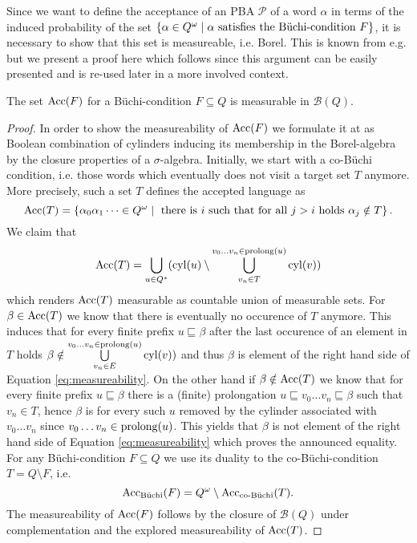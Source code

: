 Since we want to define the acceptance of an \ac{PBA} $\mathcal{P}$ of a word
$\alpha$ in terms of the induced probability of the set 
$\left\{\alpha\in Q^{\omega}\mid\alpha\text{ satisfies the Büchi-condition }F\right\}$,
it is necessary to show that this set is measureable, i.e. Borel. This is known
from e.g. \cite[Chapter 4.1.1.]{Groesser} but we present a proof here which
follows \cite[Proposition 6]{RandAutoInfTrees} since this argument can be
easily presented and is re-used later in a more involved context.
\begin{lemma}[Measurability]
  The set $\operatorname{Acc}(F)$ for a Büchi-condition $F\subseteq Q$ is measurable in 
  $\mathcal{B}(Q)$.
  \label{lem:measureabilityAcceptance}
\end{lemma}
\begin{proof}
  In order to show the measureability of $\operatorname{Acc}(F)$ we formulate it at as
  Boolean combination of cylinders inducing its membership in the 
  Borel-algebra by the closure properties of a $\sigma$-algebra.
  Initially, we start with a co-Büchi condition, i.e. those words which 
  eventually does not visit a target set $T$ anymore. More precisely, such a 
  set $T$ defines the accepted language as
  \begin{equation*}
    \operatorname{Acc}(T) = \left\{\alpha_{0}\alpha_{1}\dots\in Q^{\omega}\mid\text{ there is } 
    i \text{ such that for all } j>i \text{ holds }\alpha_{j}\notin T\right\}.
  \end{equation*}
  We claim that
  \begin{equation} 
    \operatorname{Acc}(T) = \bigcup\limits_{u\in Q^{*}}(
    \operatorname{cyl}(u)\setminus\bigcup\limits^{v_{0}\dots v_{n}\in\operatorname{prolong}(u)}_{v_{n}\in T}
    \operatorname{cyl}(v))
    \label{eq:measureability}
  \end{equation}
  which renders $\operatorname{Acc}(T)$ measurable as countable union of measurable sets.
  For $\beta\in\operatorname{Acc}(T)$ we know that there is eventually no occurence of $T$
  anymore. This induces that for every finite prefix $u\sqsubseteq\beta$ after 
  the last occurence of an element in $T$ holds
  $\beta\notin\bigcup\limits^{v_{0}\dots v_{n}\in\operatorname{prolong}(u)}_{v_{n}\in E}
  \operatorname{cyl}(v))$ and thus $\beta$ is element of the right hand side of Equation 
  \ref{eq:measureability}. On the other hand if $\beta\notin\operatorname{Acc}(T)$ we know 
  that for every finite prefix $u\sqsubseteq\beta$ there is a (finite) 
  prolongation $u\sqsubseteq v_{0}\dots v_{n}\sqsubseteq\beta$ such that 
  $v_{n}\in T$, hence $\beta$ is for every such $u$ removed by the cylinder 
  associated with $v_{0}\dots v_{n}$ since $v_{0}\dots v_{n}\in\operatorname{prolong}(u)$.
  This yields that $\beta$ is not element of the right hand side of Equation
  \ref{eq:measureability} which proves the announced equality. 
  For any Büchi-condition $F\subseteq Q$ we use its duality to the 
  co-Büchi-condition $T = Q\setminus F$, i.e.
  \begin{equation*}
    \operatorname{Acc}_{\operatorname{B\ddot{u}chi}}(F) = Q^{\omega}\setminus\operatorname{Acc}_{\operatorname{co-B\ddot{u}chi}}(T).
  \end{equation*}
  The measureability of $\operatorname{Acc}(F)$ follows by the closure of $\mathcal{B}(Q)$
  under complementation and the explored measureability of $\operatorname{Acc}(T)$.
\end{proof}
